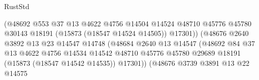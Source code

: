 \begin{lexlean}{RustStd}
\begin{coremodule}
                                              (@48692
                                                @553
                                                @37
                                                @13
                                                @4622
                                                @4756
                                                @14504
                                                @14524
                                                @48710
                                                @45776
                                                @45780
                                                @30143
                                                @18191
                                                (@15873 (@18547 @14524 @14505))
                                                @17301))
                                            (@48676
                                              @2640
                                              @3892
                                              @13
                                              @23
                                              @14547
                                              @14748
                                              (@48684
                                                @2640
                                                @13
                                                @14547
                                                (@48692
                                                  @84
                                                  @37
                                                  @13
                                                  @4622
                                                  @4756
                                                  @14534
                                                  @14542
                                                  @48710
                                                  @45776
                                                  @45780
                                                  @29689
                                                  @18191
                                                  (@15873 (@18547 @14542 @14535))
                                                  @17301))
                                              (@48676
                                                @3739
                                                @3891
                                                @13
                                                @22
                                                @14575

\end{coremodule}
\end{lexlean}
